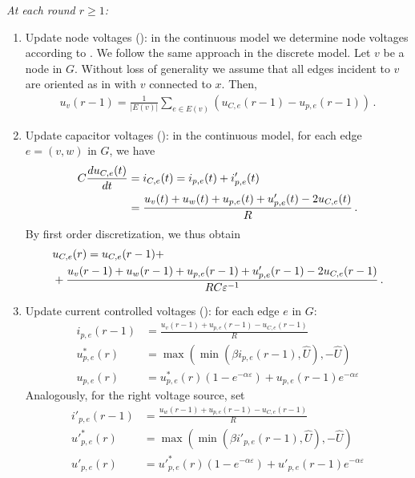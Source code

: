 \noindent
{\em At each round $r \ge 1$:}
\begin{enumerate}
\item Update node voltages (): in the continuous model we determine node voltages according to .
We follow the same approach in the discrete model.
Let $v$ be a node in $G$. Without loss of generality we assume that all edges incident to $v$ are oriented as in  with $v$ connected to $x$.
Then,
\begin{align}
u_v(r-1) = \frac{1}{|E(v)|}\sum_{e \in E(v)}(u_{C,e}(r-1)-u_{p,e}(r-1))\,.\label{eq:dis:u}
\end{align}

\item Update capacitor voltages (): in the continuous model, for each edge $e=(v,w)$ in $G$, we have
\begin{align}
  C\frac{d u_{C,e}(t)}{dt} &= i_{C,e}(t) = i_{p,e}(t) + i'_{p,e}(t)\notag\\
  &= \frac{u_v(t)+u_w(t)+u_{p,e}(t)+u'_{p,e}(t)-2u_{C,e}(t)}{R}\,.
\end{align}
By first order discretization, we thus obtain
\begin{align}
  &u_{C,e}(r) = u_{C,e}(r-1) +\notag\\
  &+\frac{u_v(r-1)+u_w(r-1)+u_{p,e}(r-1)+u'_{p,e}(r-1)-2u_{C,e}(r-1)}{RC\varepsilon^{-1}}\,.\label{eq:dis:uC}
\end{align}

\item Update current controlled voltages (): for each edge $e$ in $G$:
\begin{align}
i_{p,e}(r-1) &= \frac{u_v(r-1)+u_{p,e}(r-1)-u_{C,e}(r-1)}{R}\label{eq:left_up_18}\\  
u^*_{p,e}(r) &= \max(\min(\beta i_{p,e}(r-1),\hat{U}),-\hat{U})\label{eq:left_up_19}\\
u_{p,e}(r)   &= u^*_{p,e}(r)(1-e^{-\alpha \varepsilon})+ u_{p,e}(r-1)e^{-\alpha \varepsilon}\label{eq:left_up_20}
\end{align}
Analogously, for the right voltage source, set
\begin{align}
i'_{p,e}(r-1) &= \frac{u_w(r-1)+u_{p,e}(r-1)-u_{C,e}(r-1)}{R}\label{eq:right_up_21}\\  
{u'}^*_{p,e}(r) &= \max(\min(\beta i'_{p,e}(r-1),\hat{U}),-\hat{U})\label{eq:right_up_22}\\
u'_{p,e}(r)   &= {u'}^*_{p,e}(r)(1-e^{-\alpha \varepsilon})+ u'_{p,e}(r-1)e^{-\alpha \varepsilon}\label{eq:right_up_23}
\end{align}

\end{enumerate}

